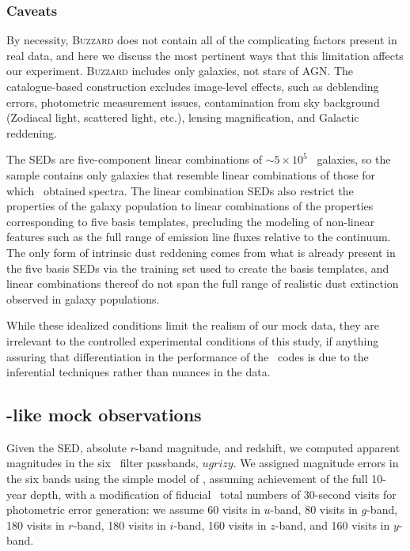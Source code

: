 \subsubsection{Caveats}
\label{sec:buzzlimitations}

By necessity, \textsc{Buzzard} does not contain all of the complicating factors present in real data, and here we discuss the most pertinent ways that this limitation affects our experiment.
\textsc{Buzzard} includes only galaxies, not stars of AGN.
The catalogue-based construction excludes image-level effects, such as deblending errors, photometric measurement issues, contamination from sky background (Zodiacal light, scattered light, etc.), lensing magnification, and Galactic reddening.

The SEDs are five-component linear combinations of $\sim 5 \times 10^{5}$ \sdss\ galaxies, so the sample contains only galaxies that resemble linear combinations of those for which \sdss\ obtained spectra.
The linear combination SEDs also restrict the properties of the galaxy population to linear combinations of the properties corresponding to five basis templates, precluding the modeling of non-linear features such as the full range of emission line fluxes relative to the continuum.
The only form of intrinsic dust reddening comes from what is already present in the five basis SEDs via the training set used to create the basis templates, and linear combinations thereof do not span the full range of realistic dust extinction observed in galaxy populations.

While these idealized conditions limit the realism of our mock data, they are irrelevant to the controlled experimental conditions of this study, if anything assuring that differentiation in the performance of the \pzpdf\ codes is due to the inferential techniques rather than nuances in the data.

\subsection{\lsst-like mock observations}
\label{sec:observations}

Given the SED, absolute $r$-band magnitude, and redshift, we computed apparent magnitudes in the six \lsst\ filter passbands, $ugrizy$.
We assigned magnitude errors in the six bands using the simple model of \citet{Ivezic:08}, assuming achievement of the full 10-year depth, with a modification of fiducial \lsst\ total numbers of 30-second visits for photometric error generation: we assume 60 visits in $u$-band, 80 visits in $g$-band, 180 visits in $r$-band, 180 visits in $i$-band, 160 visits in $z$-band, and 160 visits in $y$-band.

